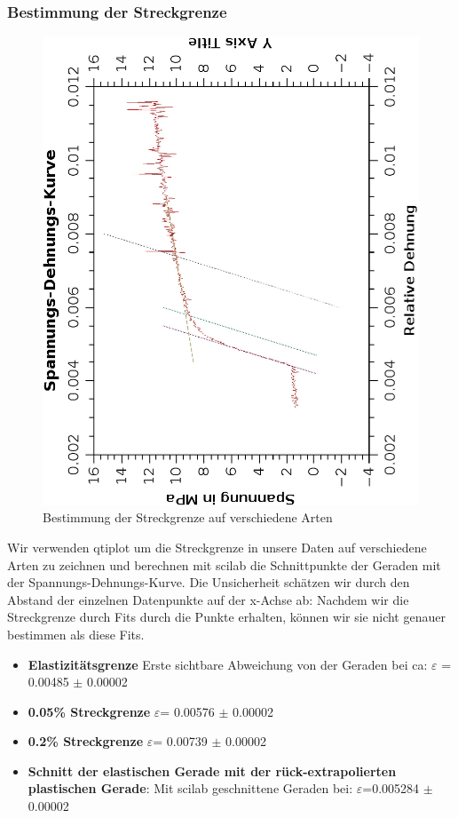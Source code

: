 \documentclass{article}
\begin{document}
\subsubsection*{Bestimmung der Streckgrenze}
\begin{center}
\begin{figure}[H]
\caption{Bestimmung der Streckgrenze auf verschiedene Arten}
\includegraphics[scale=0.8,angle=-90]{streckgrenze2.eps}
\end{figure}
\end{center}
Wir verwenden qtiplot um die Streckgrenze in unsere Daten auf verschiedene Arten zu zeichnen und berechnen mit scilab die Schnittpunkte der Geraden mit der Spannungs-Dehnungs-Kurve. Die Unsicherheit schätzen wir durch den Abstand der einzelnen Datenpunkte auf der x-Achse ab: Nachdem wir die Streckgrenze durch Fits durch die Punkte erhalten, können wir sie nicht genauer bestimmen als diese Fits.
\begin{itemize}
\item \textbf{Elastizitätsgrenze} Erste sichtbare Abweichung von der Geraden bei ca: $\varepsilon$ = 0.00485 $\pm$ 0.00002
\item \textbf{0.05\% Streckgrenze} $\varepsilon$= 0.00576 $\pm$ 0.00002
\item \textbf{0.2\% Streckgrenze} $\varepsilon$= 0.00739 $\pm$ 0.00002
\item \textbf{Schnitt der elastischen Gerade mit der rück-extrapolierten plastischen Gerade}: Mit scilab geschnittene Geraden bei: $\varepsilon$=0.005284 $\pm$ 0.00002
\end{itemize}
\end{document}
